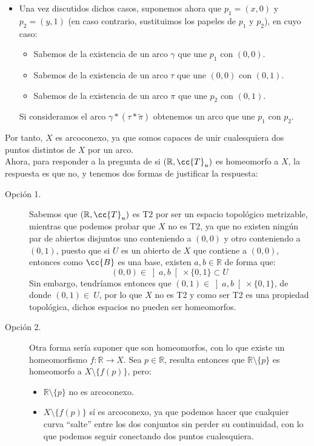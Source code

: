 \begin{ejercicio}
\begin{itemize}
            Notemos que la elección del punto $(0,0)$ y $(0,1)$ es arbitraria. Bastaría con tomar $p_1=(x,0)$ y $p_2 = (x,1)$.
        \item Una vez discutidos dichos casos, suponemos ahora que $p_1=(x,0)$ y $p_2 = (y,1)$ (en caso contrario, sustituimos los papeles de $p_1$ y $p_2$), en cuyo caso:
            \begin{itemize}
                \item Sabemos de la existencia de un arco $\gamma$ que une $p_1$ con $(0,0)$.
                \item Sabemos de la existencia de un arco $\tau$ que une $(0,0)$ con $(0,1)$.
                \item Sabemos de la existencia de un arco $\pi$ que une $p_2$ con $(0,1)$.
            \end{itemize}
            Si consideramos el arco $\gamma \ast (\tau \ast \tilde{\pi})$ obtenemos un arco que une $p_1$ con $p_2$.
    \end{itemize} 
    Por tanto, $X$ es arcoconexo, ya que somos capaces de unir cualesquiera dos puntos distintos de $X$ por un arco.\\

    \noindent
    Ahora, para responder a la pregunta de si $(\mathbb{R},\cc{T}_u)$ es homeomorfo a $X$, la respuesta es que no, y tenemos dos formas de justificar la respuesta:
    \begin{description}
        \item [Opción 1.] Sabemos que $(\mathbb{R},\cc{T}_u)$ es T2 por ser un espacio topológico metrizable, mientras que podemos probar que $X$ no es T2, ya que no existen ningún par de abiertos disjuntos uno conteniendo a $(0,0)$ y otro conteniendo a $(0,1)$, puesto que si $U$ es un abierto de $X$ que contiene a $(0,0)$, entonces como $\cc{B}$ es una base, existen $a,b\in \mathbb{R}$ de forma que:
            \begin{equation*}
                (0,0) \in \left]a,b\right[\times \{0,1\} \subset U
            \end{equation*}
            Sin embargo, tendríamos entonces que $(0,1)\in \left]a,b\right[\times \{0,1\}$, de donde $(0,1)\in~U$, por lo que $X$ no es T2 y como ser T2 es una propiedad topológica, dichos espacios no pueden ser homeomorfos.
        \item [Opción 2.] Otra forma sería suponer que son homeomorfos, con lo que existe un homeomorfismo $f:\mathbb{R}\to X$. Sea $p\in \mathbb{R}$, resulta entonces que $\mathbb{R}\setminus \{p\}$ es homeomorfo a $X\setminus \{f(p)\}$, pero:
            \begin{itemize}
                \item $\mathbb{R}\setminus\{p\}$ no es arcoconexo.
                \item $X\setminus \{f(p)\}$ sí es arcoconexo, ya que podemos hacer que cualquier curva ``salte'' entre los dos conjuntos sin perder su continuidad, con lo que podemos seguir conectando dos puntos cualesquiera.
            \end{itemize}
    \end{description}
\end{ejercicio}

